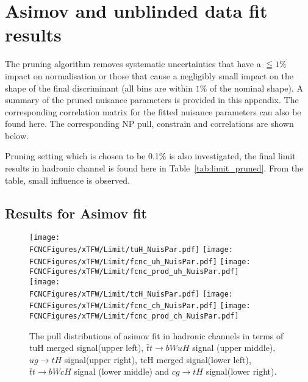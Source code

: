 \section{Asimov and unblinded data fit results}
The pruning algorithm removes systematic uncertainties that have a  $\leqq 1\%$ impact on normalisation or those that cause a negligibly small impact on the shape of the final discriminant (all bins are within $1\%$ of the nominal shape). A summary of the pruned nuisance parameters is provided in this appendix.
The corresponding correlation matrix for the fitted nuisance parameters can also be found here. The corresponding NP pull, constrain and correlations are shown below.

Pruning setting  which is chosen to be 0.1\% is also investigated, the final limit results in hadronic channel is found here in Table~\ref{tab:limit_pruned}. From the table, small influence is observed.


\subsection{Results for Asimov fit}
\label{sec:app_asimovfit}

\begin{figure}[H]
\centering

\texttt{[image: \\FCNCFigures/xTFW/Limit/tuH\_NuisPar.pdf]}
\texttt{[image: \\FCNCFigures/xTFW/Limit/fcnc\_uh\_NuisPar.pdf]}
\texttt{[image: \\FCNCFigures/xTFW/Limit/fcnc\_prod\_uh\_NuisPar.pdf]}
\\
\texttt{[image: \\FCNCFigures/xTFW/Limit/tcH\_NuisPar.pdf]}
\texttt{[image: \\FCNCFigures/xTFW/Limit/fcnc\_ch\_NuisPar.pdf]}
\texttt{[image: \\FCNCFigures/xTFW/Limit/fcnc\_prod\_ch\_NuisPar.pdf]}
\caption{The pull distributions of asimov fit in hadronic channels in terms of tuH merged signal(upper left), $\bar{t}t\to bWuH$ signal (upper middle), $ug\to tH$ signal(upper right), tcH merged signal(lower left), $\bar{t}t\to bWcH$ signal (lower middle) and $cg\to tH$ signal(lower right).}
\label{fig:tcH_NuisPar}
\end{figure}

%



